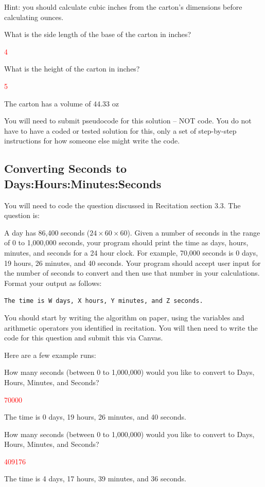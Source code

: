 Hint: you should calculate cubic inches from the carton's dimensions before calculating ounces.

\begin{sample}
What is the side length of the base of the carton in inches?

\textcolor{red}{4}

What is the height of the carton in inches?

\textcolor{red}{5}

The carton has a volume of 44.33 oz
\end{sample}

You will need to submit pseudocode for this solution -- NOT code. You do not have to have a coded or tested solution for this, only a set of step-by-step instructions for how someone else might write the code.  

\subsection{Converting Seconds to Days:Hours:Minutes:Seconds}
You will need to code the question discussed in Recitation section 3.3. The question is:

A day has 86,400 seconds ($24 \times 60 \times 60$). Given a number of seconds in the range of 0 to 1,000,000 seconds, your program should print the time as days, hours, minutes, and seconds for a 24 hour clock. For example, 70,000 seconds is 0 days, 19 hours, 26 minutes, and 40 seconds. Your program should accept user input for the number of seconds to convert and then use that number in your calculations. Format your output as follows: 

\texttt{The time is W days, X hours, Y minutes, and Z seconds.}

You should start by writing the algorithm on paper, using the variables and arithmetic operators you identified in recitation. You will then need to write the code for this question and submit this via Canvas. 

Here are a few example runs:

\begin{sample}
    How many seconds (between 0 to 1,000,000) would you like to convert to Days, Hours, Minutes, and Seconds?

    \textcolor{red}{70000}

    The time is 0 days, 19 hours, 26 minutes, and 40 seconds.
\end{sample}

\begin{sample}
    How many seconds (between 0 to 1,000,000) would you like to convert to Days, Hours, Minutes, and Seconds?

    \textcolor{red}{409176}

    The time is 4 days, 17 hours, 39 minutes, and 36 seconds.
\end{sample}


